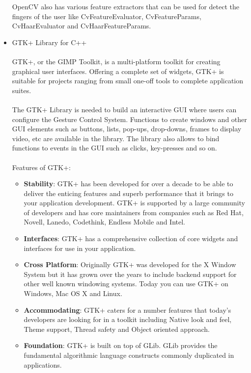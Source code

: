 \documentclass{scrreprt}
\begin{document}
\begin{itemize}
    OpenCV also has various feature extractors that can be used for detect the fingers of the user like CvFeatureEvaluator, CvFeatureParams, CvHaarEvaluator and CvHaarFeatureParams.
    \item GTK+ Library for C++
    \\
    \\GTK+, or the GIMP Toolkit, is a multi-platform toolkit for creating graphical user interfaces. Offering a complete set of widgets, GTK+ is suitable for projects ranging from small one-off tools to complete application suites.
    \\
    \\The GTK+ Library is needed to build an interactive GUI where users can configure the Gesture Control System. Functions to create windows and other GUI elements such as buttons, lists, pop-ups, drop-downs, frames to display video, etc are available in the library. The library also allows to bind functions to events in the GUI such as clicks, key-presses and so on.
    \\
    \\Features of GTK+:
    \begin{itemize}
        \item \textbf{Stability}: GTK+ has been developed for over a decade to be able to deliver the enticing features and superb performance that it brings to your application development. GTK+ is supported by a large community of developers and has core maintainers from companies such as Red Hat, Novell, Lanedo, Codethink, Endless Mobile and Intel.
        \item \textbf{Interfaces}: GTK+ has a comprehensive collection of core widgets and interfaces for use in your application.
        \item \textbf{Cross Platform}: Originally GTK+ was developed for the X Window System but it has grown over the years to include backend support for other well known windowing systems. Today you can use GTK+ on Windows, Mac OS X and Linux.
        \item \textbf{Accommodating}: GTK+ caters for a number features that today's developers are looking for in a toolkit including Native look and feel, Theme support, Thread safety and Object oriented approach.
        \item \textbf{Foundation}: GTK+ is built on top of GLib. GLib provides the fundamental algorithmic language constructs commonly duplicated in applications.
    \end{itemize}
\end{itemize}
\end{document}
